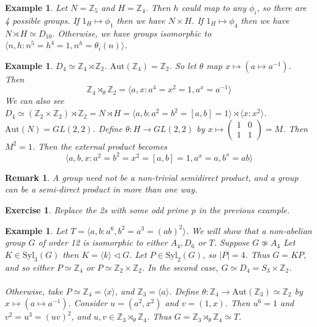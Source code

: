 \documentclass[a4paper,10pt]{article}
\newcommand{\ZZ}{\mathbb{Z}}
\newtheorem{eg}[thm]{Example}
\newtheorem{Ex}[thm]{Exercise}
\newtheorem{rem}[thm]{Remark}
\begin{document}
\begin{eg}
Let $N = \ZZ_5$ and $H = \ZZ_4$. Then $h$ could map to any $\phi_i$, so there are 4 possible groups. If $1_H \mapsto \phi_1$ then we have $N \times H$. If $1_H \mapsto \phi_4$ then we have $N \rtimes H \simeq D_{10}$. Otherwise, we have groups isomorphic to $\langle n,h : n^5 = h^4 = 1, n^h = \theta_i(n) \rangle$.  
\end{eg}


\begin{eg}
$D_4 \simeq \ZZ_4 \rtimes \ZZ_2$. $\text{Aut}(\ZZ_4) = \ZZ_2$. So let $\theta$ map $x \mapsto (a \mapsto a^{-1})$. Then
\[ \ZZ_4 \rtimes_\theta \ZZ_2 = \langle a, x : a^4 = x^2 = 1, a^x = a^{-1} \rangle \]
We can also see $D_4 \simeq (\ZZ_2 \times \ZZ_2) \rtimes \ZZ_2 = N \rtimes H = \langle a,b : a^2 = b^2 = [a,b] = 1 \rangle \rtimes \langle x : x^2 \rangle$. $\text{Aut}(N) = GL(2,2)$. Define $\theta: H \rightarrow GL(2,2)$ by $x \mapsto \begin{pmatrix} 1 & 0 \\ 1 & 1 \end{pmatrix} = M$. Then $M^2 = 1$. Then the external product becomes
\[ \langle a,b,x : a^2 = b^2 = x^2 = [a,b] = 1, a^x = a, b^x = ab \rangle \]
\end{eg}

\begin{rem}
A group need not be a non-trivial semidirect product, and a group can be a semi-direct product in more than one way.
\end{rem}

\begin{Ex}
Replace the 2s with some odd prime $p$ in the previous example.
\end{Ex}

\begin{eg}
Let $T = \langle a, b : a^6, b^2 = a^3 = (ab)^2 \rangle$. We will show that a non-abelian group $G$ of order 12 is isomorphic to either $A_4, D_6$ or $T$. Suppose $G \not\simeq A_4$ Let $K \in \text{Syl}_3(G)$ then $K = \langle k \rangle \triangleleft G$. Let $P \in \text{Syl}_2(G)$, so $|P| = 4$. Thus $G = KP$, and so either $P \simeq \ZZ_4$ or $P \simeq \ZZ_2 \times \ZZ_2$. In the second case, $G \simeq D_4 = S_3 \times \ZZ_2$. \\
\\
Otherwise, take $P \simeq \ZZ_4 = \langle x \rangle$, and $\ZZ_3 = \langle a \rangle$. Define $\theta : \ZZ_4 \rightarrow \text{Aut}(\ZZ_3) \simeq \ZZ_2$ by $x \mapsto (a \mapsto a^{-1})$. Consider $u = (a^2, x^2)$ and $v = (1,x)$. Then $u^6 = 1$ and $v^2 = u^3 = (uv)^2$, and $u,v \in \ZZ_3 \rtimes_\theta \ZZ_4$. Thus $G = \ZZ_3 \rtimes_\theta \ZZ_4 \simeq T$. 
\end{eg}
\end{document}
